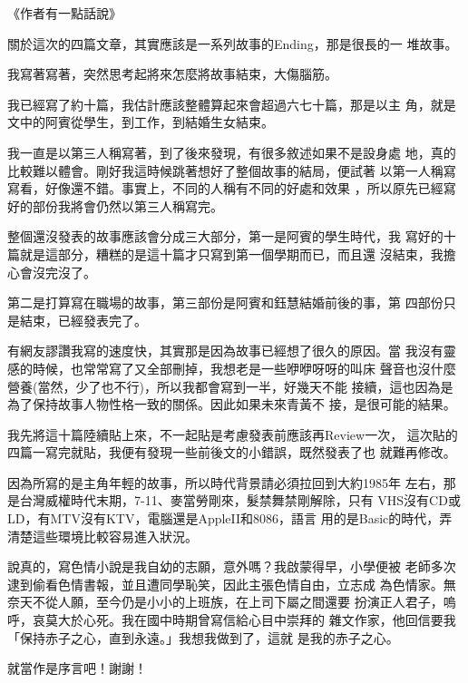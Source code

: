 《作者有一點話說》

關於這次的四篇文章，其實應該是一系列故事的Ending，那是很長的一
堆故事。

我寫著寫著，突然思考起將來怎麼將故事結束，大傷腦筋。

我已經寫了約十篇，我估計應該整體算起來會超過六七十篇，那是以主
角，就是文中的阿賓從學生，到工作，到結婚生女結束。

我一直是以第三人稱寫著，到了後來發現，有很多敘述如果不是設身處
地，真的比較難以體會。剛好我這時候跳著想好了整個故事的結局，便試著
以第一人稱寫寫看，好像還不錯。事實上，不同的人稱有不同的好處和效果
，所以原先已經寫好的部份我將會仍然以第三人稱寫完。

整個還沒發表的故事應該會分成三大部分，第一是阿賓的學生時代，我
寫好的十篇就是這部分，糟糕的是這十篇才只寫到第一個學期而已，而且還
沒結束，我擔心會沒完沒了。

第二是打算寫在職場的故事，第三部份是阿賓和鈺慧結婚前後的事，第
四部份只是結束，已經發表完了。

有網友謬讚我寫的速度快，其實那是因為故事已經想了很久的原因。當
我沒有靈感的時候，也常常寫了又全部刪掉，我想老是一些咿咿呀呀的叫床
聲音也沒什麼營養(當然，少了也不行)，所以我都會寫到一半，好幾天不能
接續，這也因為是為了保持故事人物性格一致的關係。因此如果未來青黃不
接，是很可能的結果。

我先將這十篇陸續貼上來，不一起貼是考慮發表前應該再Review一次，
這次貼的四篇一寫完就貼，我便有發現一些前後文的小錯誤，既然發表了也
就難再修改。

因為所寫的是主角年輕的故事，所以時代背景請必須拉回到大約1985年
左右，那是台灣威權時代末期，7-11、麥當勞剛來，髮禁舞禁剛解除，只有
VHS沒有CD或LD，有MTV沒有KTV，電腦還是AppleII和8086，語言
用的是Basic的時代，弄清楚這些環境比較容易進入狀況。

說真的，寫色情小說是我自幼的志願，意外嗎？我啟蒙得早，小學便被
老師多次逮到偷看色情書報，並且遭同學恥笑，因此主張色情自由，立志成
為色情家。無奈天不從人願，至今仍是小小的上班族，在上司下屬之間還要
扮演正人君子，嗚呼，哀莫大於心死。我在國中時期曾寫信給心目中崇拜的
雜文作家，他回信要我「保持赤子之心，直到永遠。」我想我做到了，這就
是我的赤子之心。

就當作是序言吧！謝謝！